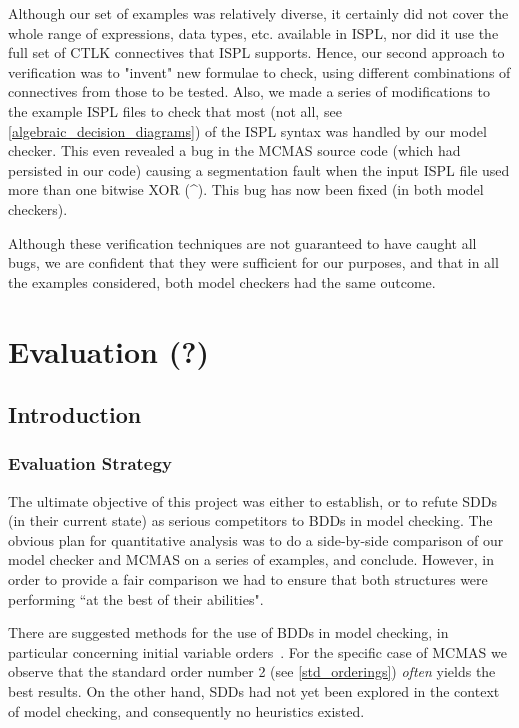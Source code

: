 \documentclass[11pt]{article}
\begin{document}
Although our set of examples was relatively diverse, it certainly did not cover the whole range of expressions, data types, etc. available in ISPL, nor did it use the full set of CTLK connectives that ISPL supports.
Hence, our second approach to verification was to "invent" new formulae to check, using different combinations of connectives from those to be tested. Also, we made a series of modifications to the example ISPL files to check that most (not all, see \ref{algebraic_decision_diagrams}) of the ISPL syntax was handled by our model checker. This even revealed a bug in the MCMAS source code (which had persisted in our code) causing a segmentation fault when the input ISPL file used more than one bitwise XOR (\^{}). This bug has now been fixed (in both model checkers).

Although these verification techniques are not guaranteed to have caught all bugs, we are confident that they were sufficient for our purposes, and that in all the examples considered, both model checkers had the same outcome.


\section{Evaluation (?)} 

\subsection{Introduction}

\subsubsection{Evaluation Strategy}

The ultimate objective of this project was either to establish, or to refute SDDs (in their current state) as serious competitors to BDDs in model checking. The obvious plan for quantitative analysis was to do a side-by-side comparison of our model checker and MCMAS on a series of examples, and conclude. However, in order to provide a fair comparison we had to ensure that both structures were performing ``at the best of their abilities". 

There are suggested methods for the use of BDDs in model checking, in particular concerning initial variable orders~\cite{bdd_heuristics}. For the specific case of MCMAS we observe that the standard order number 2 (see \ref{std_orderings}) \textit{often} yields the best results.
On the other hand, SDDs had not yet been explored in the context of model checking, and consequently no heuristics existed. 
\end{document}
